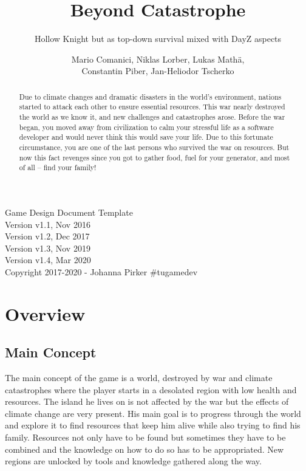 \documentclass[a4paper]{scrreprt}
\title{Beyond Catastrophe}
\subtitle{Hollow Knight but as top-down survival mixed with DayZ aspects}
\author{Mario Comanici, Niklas Lorber, Lukas Mathä,\\ Constantin Piber, Jan-Heliodor Tscherko}
\begin{document}
\maketitle

\null\vfill
Game Design Document Template\\ 
Version v1.1, Nov 2016\\
Version v1.2, Dec 2017\\
Version v1.3, Nov 2019\\
Version v1.4, Mar 2020\\
Copyright 2017-2020 - Johanna Pirker \#tugamedev\\
\newpage

\begin{abstract}
Due to climate changes and dramatic disasters in the world's environment,
nations started to attack each other to ensure essential resources. This war
nearly destroyed the world as we know it, and new challenges and catastrophes
arose. Before the war began, you moved away from
civilization to calm your stressful life as a software developer and would never
think this would save your life. Due to this fortunate circumstance, you are one
of the last persons who survived the war on resources. But now this fact
revenges since you got to gather food, fuel for your generator, and most of all
-- find your family! 
\end{abstract}

\tableofcontents

\chapter{Overview}

\section{Main Concept}
The main concept of the game is a world, destroyed by war and climate catastrophes where the player starts in a desolated region with low health and resources. The island he lives on is not affected by the war but the effects of climate change are very present. His main goal is to progress through the world and explore it to find resources that keep him alive while also trying to find his family. Resources not only have to be found but sometimes they have to be combined and the knowledge on how to do so has to be appropriated. New regions are unlocked by tools and knowledge gathered along the way.
\end{document}
